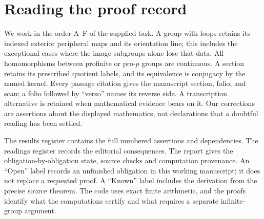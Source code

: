 \documentclass[11pt,a4paper]{article}
\begin{document}
\section*{Reading the proof record}
We work in the order A--F of the supplied task. A group with loops retains its
indexed exterior peripheral maps and its orientation line; this includes the
exceptional cases where the image subgroups alone lose that data. All
homomorphisms between profinite or pro-$p$ groups are continuous. A section
retains its prescribed quotient labels, and its equivalence is conjugacy by
the named kernel. Every passage citation gives the manuscript section, folio,
and scan; a folio followed by ``verso'' names its reverse side. A transcription
alternative is retained when mathematical evidence bears on it. Our corrections
are assertions about the displayed mathematics, not declarations that a
doubtful reading has been settled.

The results register contains the full numbered assertions and dependencies.
The readings register records the editorial consequences. The report gives
the obligation-by-obligation state, source checks and computation provenance.
An ``Open'' label records an unfinished obligation in this working manuscript;
it does not replace a requested proof. A ``Known'' label includes the
derivation from the precise source theorem. The code uses exact finite
arithmetic, and the proofs identify what the computations certify and what
requires a separate infinite-group argument.

\tableofcontents
\clearpage
\end{document}
